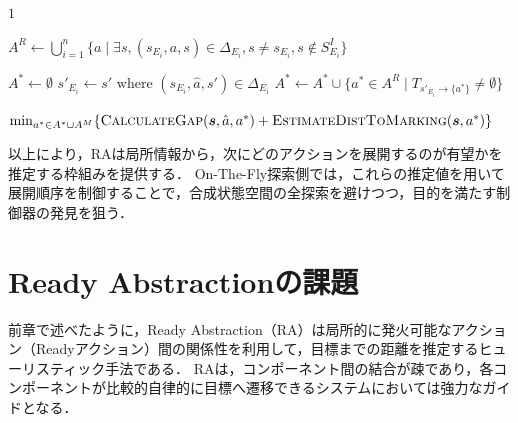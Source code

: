 \documentclass[a4paper,11pt,oneside,openany,report,dvipdfmx]{jsbook}
\begin{document}
\begin{algorithm}
  \caption{Ready AbstractionにおけるMarkingアクションまでの距離推定}
  \begin{algorithmic}[1]


      \Return $1$
    \EndIf

    \State $A^R \gets \bigcup_{i=1}^{n} \{a \mid \exists s, (s_{E_i}, a, s) \in \Delta_{E_i}, s \neq s_{E_i}, s \notin S^I_{E_i}\}$

    \State $A^* \gets \emptyset$
      \State $s'_{E_i} \gets s' \text{ where } (s_{E_i}, \hat{a}, s') \in \Delta_{E_i}$
        \State $A^* \gets A^* \cup \{ a^* \in A^R \mid T_{s'_{E_i} \to \{a^*\}} \neq \emptyset \}$
      \EndIf
    \EndFor

    \Return $\min_{a^* \in A^* \cup A^M}\{\textsc{CalculateGap}(\bm{s}, \hat{a}, a^*) + \textsc{EstimateDistToMarking}(\bm{s}, a^*)\}$

    \EndFunction
  \end{algorithmic}
\end{algorithm}

以上により，RAは局所情報から，次にどのアクションを展開するのが有望かを推定する枠組みを提供する．
On-The-Fly探索側では，これらの推定値を用いて展開順序を制御することで，合成状態空間の全探索を避けつつ，目的を満たす制御器の発見を狙う．

\chapter{Ready Abstractionの課題}
\label{chap:ready_abstraction_limitations}

前章で述べたように，Ready Abstraction（RA）は局所的に発火可能なアクション（Readyアクション）間の関係性を利用して，目標までの距離を推定するヒューリスティック手法である．
RAは，コンポーネント間の結合が疎であり，各コンポーネントが比較的自律的に目標へ遷移できるシステムにおいては強力なガイドとなる．
\end{document}
